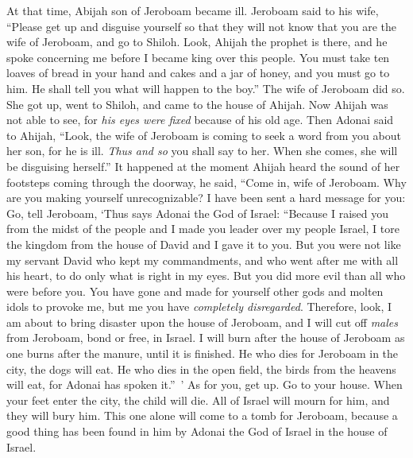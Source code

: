 \begin{biblechapter} %
 At that time, Abijah son of Jeroboam became ill.
\verse Jeroboam said to his wife, “Please get up and disguise yourself so that they will not know that you are the wife of Jeroboam, and go to Shiloh. Look, Ahijah the prophet is there, and he spoke concerning me before I became king over this people.
\verse You must take ten loaves of bread in your hand and cakes and a jar of honey, and you must go to him. He shall tell you what will happen to the boy.”
\verse The wife of Jeroboam did so. She got up, went to Shiloh, and came to the house of Ahijah. Now Ahijah was not able to see, for \textit{his eyes were fixed} because of his old age.
\verse Then Adonai said to Ahijah, “Look, the wife of Jeroboam is coming to seek a word from you about her son, for he is ill. \textit{Thus and so} you shall say to her. When she comes, she will be disguising herself.”
\verse It happened at the moment Ahijah heard the sound of her footsteps coming through the doorway, he said, “Come in, wife of Jeroboam. Why are you making yourself unrecognizable? I have been sent a hard message for you:
\verse Go, tell Jeroboam, ‘Thus says Adonai the God of Israel: “Because I raised you from the midst of the people and I made you leader over my people Israel,
\verse I tore the kingdom from the house of David and I gave it to you. But you were not like my servant David who kept my commandments, and who went after me with all his heart, to do only what is right in my eyes.
\verse But you did more evil than all who were before you. You have gone and made for yourself other gods and molten idols to provoke me, but me you have \textit{completely disregarded}.
\verse Therefore, look, I am about to bring disaster upon the house of Jeroboam, and I will cut off \textit{males} from Jeroboam, bond or free, in Israel. I will burn after the house of Jeroboam as one burns after the manure, until it is finished.
\verse He who dies for Jeroboam in the city, the dogs will eat. He who dies in the open field, the birds from the heavens will eat, for Adonai has spoken it.” ’
\verse As for you, get up. Go to your house. When your feet enter the city, the child will die.
\verse All of Israel will mourn for him, and they will bury him. This one alone will come to a tomb for Jeroboam, because a good thing has been found in him by Adonai the God of Israel in the house of Israel.

\end{biblechapter}
